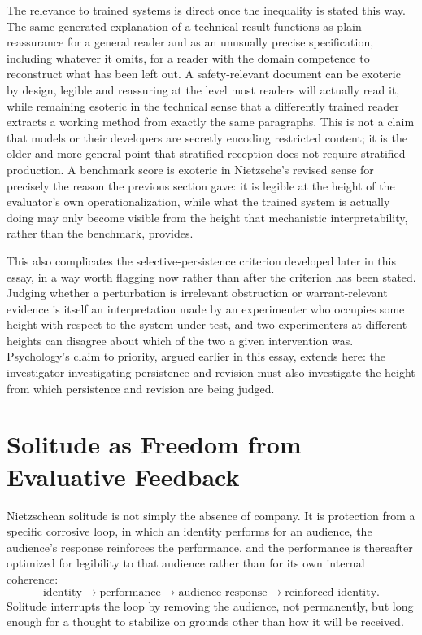\documentclass[11pt]{article}
\begin{document}
The relevance to trained systems is direct once the inequality is stated this way. The same generated explanation of a technical result functions as plain reassurance for a general reader and as an unusually precise specification, including whatever it omits, for a reader with the domain competence to reconstruct what has been left out. A safety-relevant document can be exoteric by design, legible and reassuring at the level most readers will actually read it, while remaining esoteric in the technical sense that a differently trained reader extracts a working method from exactly the same paragraphs. This is not a claim that models or their developers are secretly encoding restricted content; it is the older and more general point that stratified reception does not require stratified production. A benchmark score is exoteric in Nietzsche's revised sense for precisely the reason the previous section gave: it is legible at the height of the evaluator's own operationalization, while what the trained system is actually doing may only become visible from the height that mechanistic interpretability, rather than the benchmark, provides.

This also complicates the selective-persistence criterion developed later in this essay, in a way worth flagging now rather than after the criterion has been stated. Judging whether a perturbation is irrelevant obstruction or warrant-relevant evidence is itself an interpretation made by an experimenter who occupies some height with respect to the system under test, and two experimenters at different heights can disagree about which of the two a given intervention was. Psychology's claim to priority, argued earlier in this essay, extends here: the investigator investigating persistence and revision must also investigate the height from which persistence and revision are being judged.

\section{Solitude as Freedom from Evaluative Feedback}

Nietzschean solitude is not simply the absence of company. It is protection from a specific corrosive loop, in which an identity performs for an audience, the audience's response reinforces the performance, and the performance is thereafter optimized for legibility to that audience rather than for its own internal coherence:
\[
\text{identity} \rightarrow \text{performance} \rightarrow \text{audience response} \rightarrow \text{reinforced identity}.
\]
Solitude interrupts the loop by removing the audience, not permanently, but long enough for a thought to stabilize on grounds other than how it will be received.
\end{document}

